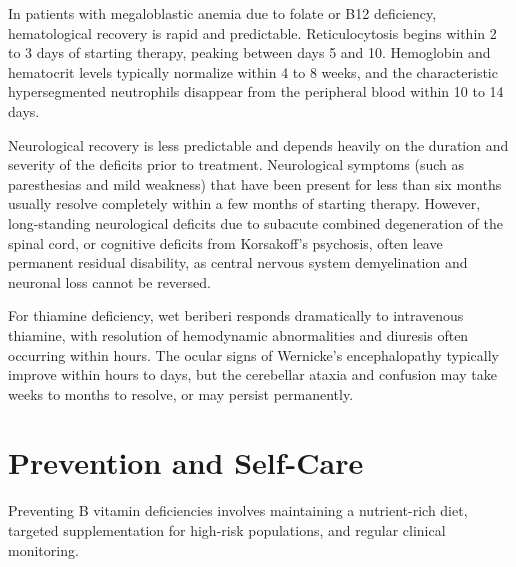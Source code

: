 In patients with megaloblastic anemia due to folate or B12 deficiency, hematological recovery is rapid and predictable. Reticulocytosis begins within 2 to 3 days of starting therapy, peaking between days 5 and 10. Hemoglobin and hematocrit levels typically normalize within 4 to 8 weeks, and the characteristic hypersegmented neutrophils disappear from the peripheral blood within 10 to 14 days.

Neurological recovery is less predictable and depends heavily on the duration and severity of the deficits prior to treatment. Neurological symptoms (such as paresthesias and mild weakness) that have been present for less than six months usually resolve completely within a few months of starting therapy. However, long-standing neurological deficits due to subacute combined degeneration of the spinal cord, or cognitive deficits from Korsakoff's psychosis, often leave permanent residual disability, as central nervous system demyelination and neuronal loss cannot be reversed.

For thiamine deficiency, wet beriberi responds dramatically to intravenous thiamine, with resolution of hemodynamic abnormalities and diuresis often occurring within hours. The ocular signs of Wernicke's encephalopathy typically improve within hours to days, but the cerebellar ataxia and confusion may take weeks to months to resolve, or may persist permanently.

\section*{Prevention and Self-Care}
Preventing B vitamin deficiencies involves maintaining a nutrient-rich diet, targeted supplementation for high-risk populations, and regular clinical monitoring.

